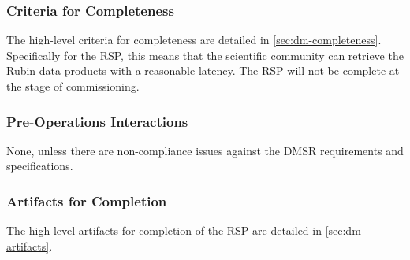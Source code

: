 \subsubsection{Criteria for Completeness}
The high-level criteria for completeness are detailed in \ref{sec:dm-completeness}. Specifically for the RSP, this means that the scientific community can retrieve the Rubin data products with a reasonable latency. The RSP will not be complete at the stage of commissioning. 

\subsubsection{Pre-Operations Interactions}
None, unless there are non-compliance issues against the DMSR requirements and specifications.

\subsubsection{Artifacts for Completion}
The high-level artifacts for completion of the RSP are detailed in \ref{sec:dm-artifacts}.   
